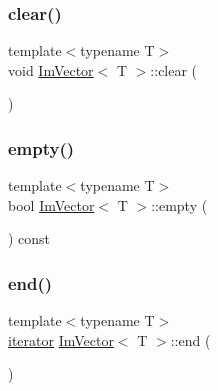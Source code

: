 \mbox{\label{class_im_vector_ae2d401b4ec5f1113cdb8edb5a61a38f7}} 
\subsubsection{\texorpdfstring{clear()}{clear()}}
{\footnotesize\ttfamily template$<$typename T$>$ \\
void \mbox{\hyperlink{class_im_vector}{Im\+Vector}}$<$ T $>$\+::clear (\begin{DoxyParamCaption}{ }\end{DoxyParamCaption})\hspace{0.3cm}{\ttfamily [inline]}}

\mbox{\label{class_im_vector_aa53e48a5272f4bad1099368769514ff1}} 
\subsubsection{\texorpdfstring{empty()}{empty()}}
{\footnotesize\ttfamily template$<$typename T$>$ \\
bool \mbox{\hyperlink{class_im_vector}{Im\+Vector}}$<$ T $>$\+::empty (\begin{DoxyParamCaption}{ }\end{DoxyParamCaption}) const\hspace{0.3cm}{\ttfamily [inline]}}

\mbox{\label{class_im_vector_a947fbc3b1d8c1997e51ae6caab440379}} 
\subsubsection{\texorpdfstring{end()}{end()}\hspace{0.1cm}{\footnotesize\ttfamily [1/2]}}
{\footnotesize\ttfamily template$<$typename T$>$ \\
\mbox{\hyperlink{class_im_vector_a74b5478f1f6fd471cc71219bce483db6}{iterator}} \mbox{\hyperlink{class_im_vector}{Im\+Vector}}$<$ T $>$\+::end (\begin{DoxyParamCaption}{ }\end{DoxyParamCaption})\hspace{0.3cm}{\ttfamily [inline]}}

